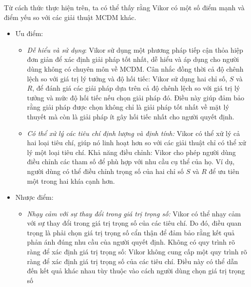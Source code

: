 Từ cách thức thực hiện trên, ta có thể thấy rằng Vikor có một số điểm mạnh và điểm yếu so với các giải thuật MCDM khác. 
\begin{itemize}
    \item Ưu điểm:
        \begin{itemize}
            \item \textit{Dễ hiểu và sử dụng}: 
            Vikor sử dụng một phương pháp tiếp cận thỏa hiệp đơn giản để xác định giải pháp tốt nhất, dễ hiểu và áp dụng cho người dùng không có chuyên môn về MCDM. Cân nhắc đồng thời cả độ chênh lệch so với giá trị lý tưởng và độ hối tiếc: Vikor sử dụng hai chỉ số, $S$ và $R$, để đánh giá các giải pháp dựa trên cả độ chênh lệch so với giá trị lý tưởng và mức độ hối tiếc nếu chọn giải pháp đó. Điều này giúp đảm bảo rằng giải pháp được chọn không chỉ là giải pháp tốt nhất về mặt lý thuyết mà còn là giải pháp ít gây hối tiếc nhất cho người quyết định. 
            \item \textit{Có thể xử lý các tiêu chí định lượng và định tính: }
Vikor có thể xử lý cả hai loại tiêu chí, giúp nó linh hoạt hơn so với các giải thuật chỉ có thể xử lý một loại tiêu chí. Khả năng điều chỉnh: Vikor cho phép người dùng điều chỉnh các tham số để phù hợp với nhu cầu cụ thể của họ. Ví dụ, người dùng có thể điều chỉnh trọng số của hai chỉ số $S$ và $R$ để ưu tiên một trong hai khía cạnh hơn. 

        \end{itemize}
    \item Nhược điểm:
        \begin{itemize}
            \item \textit{Nhạy cảm với sự thay đổi trong giá trị trọng số: }
Vikor có thể nhạy cảm với sự thay đổi trong giá trị trọng số của các tiêu chí. Do đó, điều quan trọng là phải chọn giá trị trọng số cẩn thận để đảm bảo rằng kết quả phản ánh đúng nhu cầu của người quyết định. Không có quy trình rõ ràng để xác định giá trị trọng số: Vikor không cung cấp một quy trình rõ ràng để xác định giá trị trọng số của các tiêu chí. Điều này có thể dẫn đến kết quả khác nhau tùy thuộc vào cách người dùng chọn giá trị trọng số
        \end{itemize}
\end{itemize}

